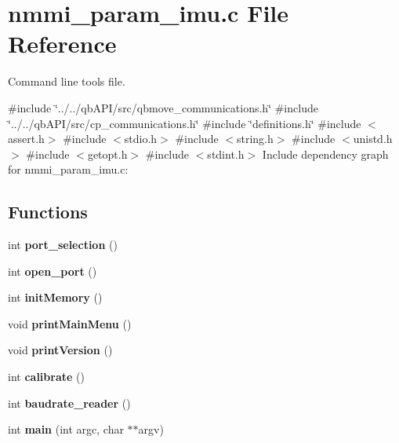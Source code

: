 \section{nmmi\+\_\+param\+\_\+imu.\+c File Reference}
\label{nmmi__param__imu_8c}


Command line tools file.  


{\ttfamily \#include \char`\"{}../../qb\+A\+P\+I/src/qbmove\+\_\+communications.\+h\char`\"{}}\newline
{\ttfamily \#include \char`\"{}../../qb\+A\+P\+I/src/cp\+\_\+communications.\+h\char`\"{}}\newline
{\ttfamily \#include \char`\"{}definitions.\+h\char`\"{}}\newline
{\ttfamily \#include $<$assert.\+h$>$}\newline
{\ttfamily \#include $<$stdio.\+h$>$}\newline
{\ttfamily \#include $<$string.\+h$>$}\newline
{\ttfamily \#include $<$unistd.\+h$>$}\newline
{\ttfamily \#include $<$getopt.\+h$>$}\newline
{\ttfamily \#include $<$stdint.\+h$>$}\newline
Include dependency graph for nmmi\+\_\+param\+\_\+imu.\+c\+:
\subsection*{Functions}
\begin{DoxyCompactItemize}
\item 
\mbox{\label{nmmi__param__imu_8c_a3939d4ef4a0e2be02b1eb9e1994ec985}} 
int {\bfseries port\+\_\+selection} ()
\item 
\mbox{\label{nmmi__param__imu_8c_abe553924eef0ba8079dc745caf1f348c}} 
int {\bfseries open\+\_\+port} ()
\item 
\mbox{\label{nmmi__param__imu_8c_a564e2594b1cf22357d72b2e2cf7fdaf3}} 
int {\bfseries init\+Memory} ()
\item 
\mbox{\label{nmmi__param__imu_8c_af9dce1973196a5934ee5ec20ea417324}} 
void {\bfseries print\+Main\+Menu} ()
\item 
\mbox{\label{nmmi__param__imu_8c_a9c4b081f1e1ad60def15811c71a936f2}} 
void {\bfseries print\+Version} ()
\item 
\mbox{\label{nmmi__param__imu_8c_aa78cef14864eb28be4f47d1ebf0e29f1}} 
int {\bfseries calibrate} ()
\item 
int \textbf{ baudrate\+\_\+reader} ()
\item 
\mbox{\label{nmmi__param__imu_8c_a3c04138a5bfe5d72780bb7e82a18e627}} 
int {\bfseries main} (int argc, char $\ast$$\ast$argv)
\end{DoxyCompactItemize}
